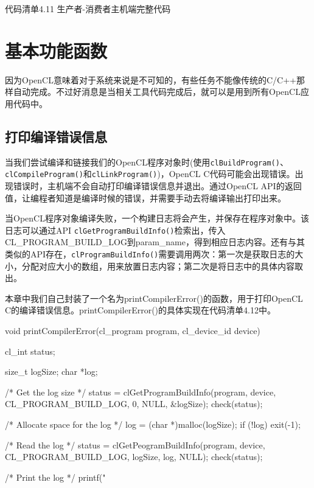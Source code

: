 代码清单4.11 生产者-消费者主机端完整代码



\section{基本功能函数}

因为OpenCL意味着对于系统来说是不可知的，有些任务不能像传统的C/C++那样自动完成。不过好消息是当相关工具代码完成后，就可以是用到所有OpenCL应用代码中。

\subsection{打印编译错误信息}

当我们尝试编译和链接我们的OpenCL程序对象时(使用\texttt{clBuildProgram()}、\texttt{clCompileProgram()}和\texttt{clLinkProgram()})，OpenCL C代码可能会出现错误。出现错误时，主机端不会自动打印编译错误信息并退出。通过OpenCL API的返回值，让编程者知道是编译时候的错误，并需要手动去将编译输出打印出来。

当OpenCL程序对象编译失败，一个构建日志将会产生，并保存在程序对象中。该日志可以通过API \texttt{clGetProgramBuildInfo()}检索出，传入CL\_\allowbreak{}PROGRAM\_\allowbreak{}BUILD\_\allowbreak{}LOG到param\_\allowbreak{}name，得到相应日志内容。还有与其类似的API存在，\texttt{clProgramBuildInfo()}需要调用两次：第一次是获取日志的大小，分配对应大小的数组，用来放置日志内容；第二次是将日志中的具体内容取出。

本章中我们自己封装了一个名为printCompilerError()的函数，用于打印OpenCL C的编译错误信息。printCompilerError()的具体实现在代码清单4.12中。

\begin{codebox}[cpp]
void printCompilerError(cl_program program, cl_device_id device)
{
  cl_int status;

  size_t logSize;
  char *log;

  /* Get the log size */
  status = clGetProgramBuildInfo(program, device, CL_PROGRAM_BUILD_LOG, 0, NULL, &logSize);
  check(status);

  /* Allocate space for the log */
  log = (char *)malloc(logSize);
  if (!log){
    exit(-1);
  }

  /* Read the log */
  status = clGetPeogramBuildInfo(program, device, CL_PROGRAM_BUILD_LOG, logSize, log, NULL);
  check(status);

  /* Print the log */
  printf("%
}
\end{codebox}

